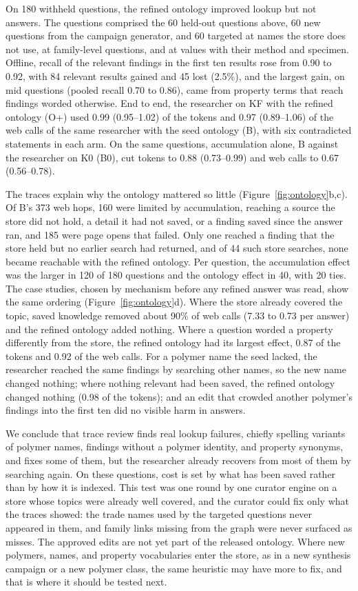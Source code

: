 \documentclass[journal=mamobx,manuscript=article]{achemso}
\begin{document}
On 180 withheld questions, the refined ontology improved lookup but not answers.
The questions comprised the 60 held-out questions above, 60 new questions from the campaign generator, and 60 targeted at names the store does not use, at family-level questions, and at values with their method and specimen.
Offline, recall of the relevant findings in the first ten results rose from 0.90 to 0.92, with 84 relevant results gained and 45 lost (2.5\%), and the largest gain, on mid questions (pooled recall 0.70 to 0.86), came from property terms that reach findings worded otherwise.
End to end, the researcher on KF with the refined ontology (O+) used 0.99 (0.95--1.02) of the tokens and 0.97 (0.89--1.06) of the web calls of the same researcher with the seed ontology (B), with six contradicted statements in each arm.
On the same questions, accumulation alone, B against the researcher on K0 (B0), cut tokens to 0.88 (0.73--0.99) and web calls to 0.67 (0.56--0.78).

The traces explain why the ontology mattered so little (Figure~\ref{fig:ontology}b,c).
Of B's 373 web hops, 160 were limited by accumulation, reaching a source the store did not hold, a detail it had not saved, or a finding saved since the answer ran, and 185 were page opens that failed.
Only one reached a finding that the store held but no earlier search had returned, and of 44 such store searches, none became reachable with the refined ontology.
Per question, the accumulation effect was the larger in 120 of 180 questions and the ontology effect in 40, with 20 ties.
The case studies, chosen by mechanism before any refined answer was read, show the same ordering (Figure~\ref{fig:ontology}d).
Where the store already covered the topic, saved knowledge removed about 90\% of web calls (7.33 to 0.73 per answer) and the refined ontology added nothing.
Where a question worded a property differently from the store, the refined ontology had its largest effect, 0.87 of the tokens and 0.92 of the web calls.
For a polymer name the seed lacked, the researcher reached the same findings by searching other names, so the new name changed nothing; where nothing relevant had been saved, the refined ontology changed nothing (0.98 of the tokens); and an edit that crowded another polymer's findings into the first ten did no visible harm in answers.

We conclude that trace review finds real lookup failures, chiefly spelling variants of polymer names, findings without a polymer identity, and property synonyms, and fixes some of them, but the researcher already recovers from most of them by searching again.
On these questions, cost is set by what has been saved rather than by how it is indexed.
This test was one round by one curator engine on a store whose topics were already well covered, and the curator could fix only what the traces showed: the trade names used by the targeted questions never appeared in them, and family links missing from the graph were never surfaced as misses.
The approved edits are not yet part of the released ontology.
Where new polymers, names, and property vocabularies enter the store, as in a new synthesis campaign or a new polymer class, the same heuristic may have more to fix, and that is where it should be tested next.
\end{document}
